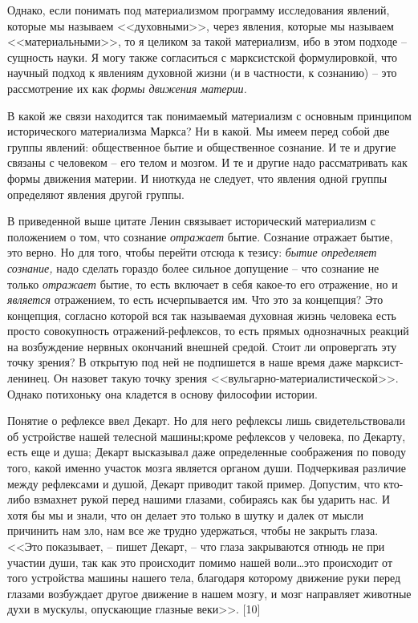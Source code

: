 \documentclass{book}
\begin{document}
Однако, если понимать под материализмом программу иссле­дования явлений, которые мы называем <<духовными>>, через явления, которые 
мы называем <<материальными>>, то я целиком за такой материализм, ибо в этом подходе -- сущность науки. Я могу также согласиться с 
марксистской формулировкой, что научный подход к явлениям духовной жизни (и в частности, к сознанию) -- это рассмотрение их как 
\textit{формы движения материи.}

В какой же связи находится так понимаемый материализм с основным принципом исторического материализма Маркса?
Ни в какой. Мы имеем перед собой две группы явлений: общественное бытие и общественное сознание. И те и другие связаны с 
человеком -- его телом и мозгом. И те и другие надо рассматривать как формы движения материи. И ниоткуда не следует, что явления 
одной группы определяют явления другой группы.

В приведенной выше цитате Ленин связывает исторический материализм с положением о том, что сознание \textit{отражает}  бытие. 
Сознание отражает бытие, это верно. Но для того, чтобы перей­ти отсюда к тезису: \textit{бытие определяет сознание,}  надо 
сделать гораздо более сильное допущение -- что сознание не только \textit{от­ражает}  бытие, то есть включает в себя какое-то его 
отражение, но и \textit{является}  отражением, то есть исчерпывается им. Что это за концепция? Это концепция, согласно которой 
вся так назы­ваемая духовная жизнь человека есть просто совокупность отражений-рефлексов, то есть прямых однозначных реакций на 
возбуждение нервных окончаний внешней средой. Стоит ли опровергать эту точку зрения? В открытую под ней не подпи­шется в наше 
время даже марксист-ленинец. Он назовет такую точку зрения <<вульгарно-материалистической>>. Однако поти­хоньку она кладется в 
основу философии истории.

Понятие о рефлексе ввел Декарт. Но для него рефлексы лишь свидетельствовали об устройстве нашей телесной машины;кроме рефлексов 
у человека, по Декарту, есть еще и душа; Декарт высказывал даже определенные соображения по пово­ду того, какой именно участок 
мозга является органом души. Подчеркивая различие между рефлексами и душой, Декарт приводит такой пример. Допустим, что кто-либо 
взмахнет рукой перед нашими глазами, собираясь как бы ударить нас. И хотя бы мы и знали, что он делает это только в шутку и 
далек от мысли причинить нам зло, нам все же трудно удержаться, чтобы не закрыть глаза. <<Это показывает, -- пишет Декарт, -- что 
глаза закрываются отнюдь не при участии души, так как это происхо­дит помимо нашей воли\ldots это происходит от того устройства 
машины нашего тела, благодаря которому движение руки перед глазами возбуждает другое движение в нашем мозгу, и мозг направляет 
животные духи в мускулы, опускающие глазные веки>>. [10]
\end{document}

